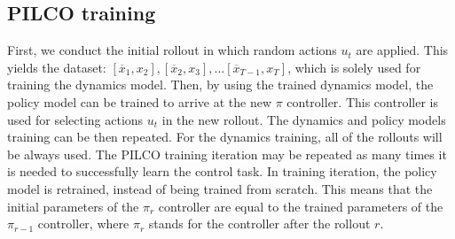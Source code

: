 \subsection{PILCO training}
\label{s:pilco:training}
First, we conduct the initial rollout in which random actions $u_{t}$ are applied. This yields the dataset: $[\overline{x}_{1}, x_{2}], [\overline{x}_{2}, x_{3}],...[\overline{x}_{T-1}, x_{T}]$, which is solely used for training the dynamics model. Then, by using the trained dynamics model, the policy model can be trained to arrive at the new $\pi$ controller. This controller is used for selecting actions $u_{t}$ in the new rollout. The dynamics and policy models training can be then repeated. For the dynamics training, all of the rollouts will be always used. The PILCO training iteration may be repeated as many times it is needed to successfully learn the control task. In training iteration, the policy model is retrained, instead of being trained from scratch. This means that the initial parameters of the $\pi_{r}$ controller are equal to the trained parameters of the $\pi_{r-1}$ controller, where $\pi_{r}$ stands for the controller after the rollout $r$.